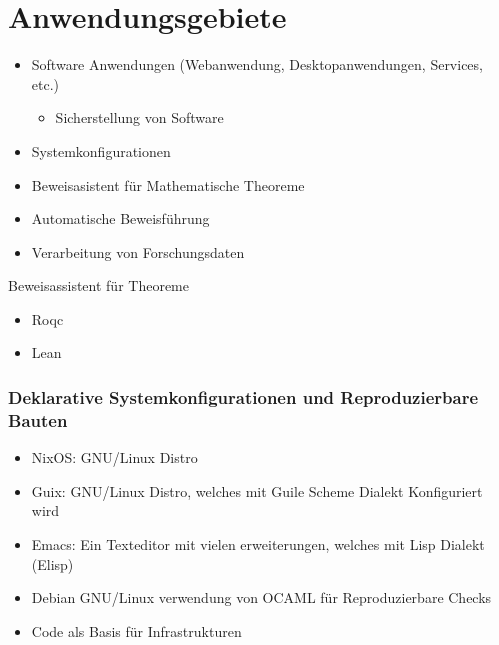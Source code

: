\documentclass{beamer}
\begin{document}
\section{Anwendungsgebiete}
\begin{frame}
	\begin{itemize}
            \item Software Anwendungen (Webanwendung, Desktopanwendungen, Services, etc.)
            \begin{itemize}
            \item  Sicherstellung von Software
            \end{itemize}
		\item Systemkonfigurationen
		\item Beweisasistent für Mathematische Theoreme
		 \item Automatische Beweisführung
            \item Verarbeitung von Forschungsdaten
    \end{itemize}
\end{frame}

\begin{frame}{Beweisassistent für Theoreme}
\centering
    \begin{itemize}
        \item  Roqc 
        \item  Lean 
    \end{itemize}

\end{frame}

\begin{frame}
\frametitle{Deklarative Systemkonfigurationen und Reproduzierbare Bauten}
 \begin{itemize}
		\item NixOS: GNU/Linux Distro
		\item Guix: GNU/Linux Distro, welches mit Guile Scheme Dialekt Konfiguriert wird
		\item Emacs: Ein Texteditor mit vielen erweiterungen, welches mit Lisp Dialekt (Elisp)
		\item Debian GNU/Linux verwendung von OCAML für Reproduzierbare Checks
        \item Code als Basis für Infrastrukturen
\end{itemize}

\end{frame}
\end{document}
